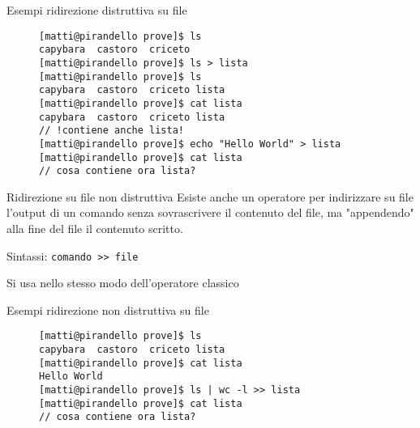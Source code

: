 \begin{frame}[fragile]{Esempi ridirezione distruttiva su file}
  \begin{figure}
    \begin{lstlisting}
[matti@pirandello prove]$ ls
capybara  castoro  criceto
[matti@pirandello prove]$ ls > lista
[matti@pirandello prove]$ ls
capybara  castoro  criceto lista
[matti@pirandello prove]$ cat lista
capybara  castoro  criceto lista 
// !contiene anche lista!
[matti@pirandello prove]$ echo "Hello World" > lista
[matti@pirandello prove]$ cat lista
// cosa contiene ora lista?
    \end{lstlisting}
  \end{figure}
\end{frame}

\begin{frame}{Ridirezione su file non distruttiva}
  Esiste anche un operatore per indirizzare su file l'output di un comando senza 
  sovrascrivere il contenuto del file, ma "appendendo" alla fine del file il
  contenuto scritto.\bigskip

  Sintassi: \texttt{comando >> file}\bigskip

  Si usa nello stesso modo dell'operatore classico\bigskip
\end{frame}

\begin{frame}[fragile]{Esempi ridirezione non distruttiva su file}
  \begin{figure}
    \begin{lstlisting}
[matti@pirandello prove]$ ls
capybara  castoro  criceto lista
[matti@pirandello prove]$ cat lista
Hello World
[matti@pirandello prove]$ ls | wc -l >> lista
[matti@pirandello prove]$ cat lista
// cosa contiene ora lista?
    \end{lstlisting}
  \end{figure}
\end{frame}
